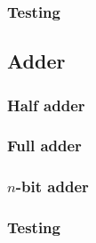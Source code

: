 \subsubsection{Testing}
\subsection{Adder}
\subsubsection{Half adder}
\subsubsection{Full adder}
\subsubsection{$n$-bit adder}
\subsubsection{Testing}
